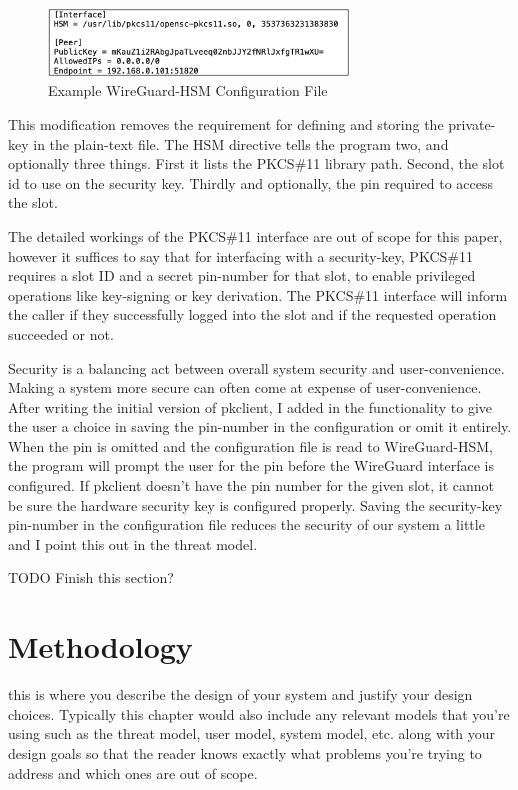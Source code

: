 \documentclass [11pt, proquest] {uwthesis}[2020/02/24]
\begin{document}
\begin{figure}[ht]
\includegraphics[width=8cm]{paper/images/wg_conf_hsm.png}
\caption{Example WireGuard-HSM Configuration File}
\label{fig:hsm_config}
\end{figure}
This modification removes the requirement for defining and storing the private-key in the plain-text file. The HSM directive tells the program two, and optionally three things. First it lists the PKCS\#11 library path. Second, the slot id  to use on the security key. Thirdly and optionally, the pin required to access the slot.

The detailed workings of the PKCS\#11 interface are out of scope for this paper, however it suffices to say that for interfacing with a security-key, PKCS\#11 requires a slot ID and a secret pin-number for that slot, to enable privileged operations like key-signing or key derivation. The PKCS\#11 interface will inform the caller if they successfully logged into the slot and if the requested operation succeeded or not.

Security is a balancing act between overall system security and user-convenience. Making a system more secure can often come at expense of user-convenience. After writing the initial version of pkclient, I added in the functionality to give the user a choice in saving the pin-number in the configuration or omit it entirely. When the pin is omitted and the configuration file is read to WireGuard-HSM, the program will prompt the user for the pin before the WireGuard interface is configured. If pkclient doesn't have the pin number for the given slot, it cannot be sure the hardware security key is configured properly. Saving the security-key pin-number in the configuration file reduces the security of our system a little and I point this out in the threat model. 

TODO Finish this section?



\chapter {Methodology}

this is where you describe the design of your system and justify your design choices.  Typically this chapter would also include any relevant models that you're using such as the threat model, user model, system model, etc. along with your design goals so that the reader knows exactly what problems you're trying to address and which ones are out of scope.
\end{document}

